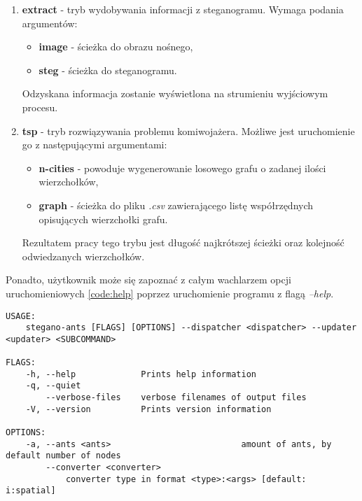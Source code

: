 {{{\begin{enumerate}
                \item \textbf{extract} - tryb wydobywania informacji z steganogramu. Wymaga podania argumentów:
                    \begin{itemize}
                        \item \textbf{image} - ścieżka do obrazu nośnego,
                        \item \textbf{steg} - ścieżka do steganogramu.
                    \end{itemize}

                    Odzyskana informacja zostanie wyświetlona na strumieniu wyjściowym procesu.

                \item \textbf{tsp} - tryb rozwiązywania problemu komiwojażera. Możliwe jest uruchomienie go z
                następującymi argumentami:
                    \begin{itemize}
                        \item \textbf{n-cities} - powoduje wygenerowanie losowego grafu o zadanej ilości wierzchołków,
                        \item \textbf{graph} - ścieżka do pliku \textit{.csv} zawierającego listę współrzędnych
                        opisujących wierzchołki grafu.
                    \end{itemize}

                    Rezultatem pracy tego trybu jest długość najkrótszej ścieżki oraz kolejność odwiedzanych wierzchołków.
            \end{enumerate}


            Ponadto, użytkownik może się zapoznać z całym wachlarzem opcji uruchomieniowych \ref{code:help} poprzez uruchomienie programu z flagą
            \textit{--help}.

            \begin{lstlisting}[basicstyle=\tiny, caption=Pomoc programu, label=code:help]
USAGE:
    stegano-ants [FLAGS] [OPTIONS] --dispatcher <dispatcher> --updater <updater> <SUBCOMMAND>

FLAGS:
    -h, --help             Prints help information
    -q, --quiet
        --verbose-files    verbose filenames of output files
    -V, --version          Prints version information

OPTIONS:
    -a, --ants <ants>                          amount of ants, by default number of nodes
        --converter <converter>
            converter type in format <type>:<args> [default: i:spatial]


\end{lstlisting}}}}
